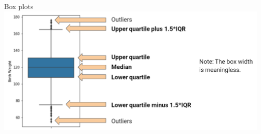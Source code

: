 \documentclass[aspectratio=169]{../latex_main/tntbeamer}  %
\begin{document}
	
	\begin{frame}{Box plots}
	    \includegraphics[scale=.4]{Bild39}
	\end{frame}
	
	
\end{document}
